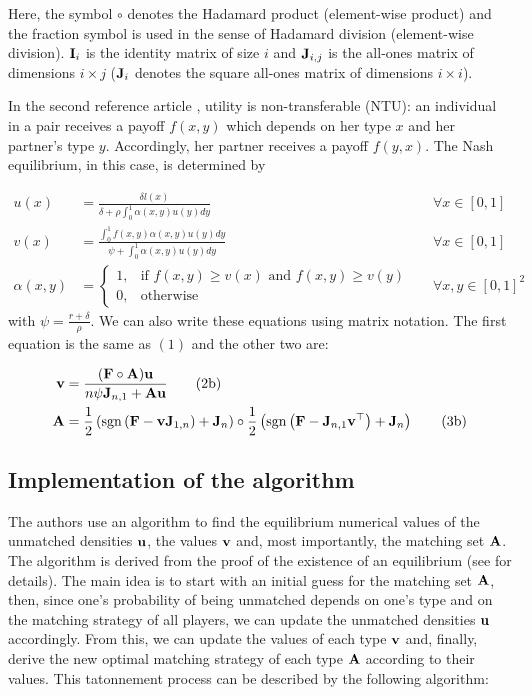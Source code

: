 Here, the symbol $\circ$ denotes the Hadamard product (element-wise product) and the fraction symbol is used in the sense of Hadamard division (element-wise division).
$\boldsymbol{\mathbf{I}}_i$ is the identity matrix of size $i$ and $\boldsymbol{\mathbf{J}}_{i,j}$ is the all-ones matrix of dimensions $i \times j$ ($\boldsymbol{\mathbf{J}}_{i}$ denotes the square all-ones matrix of dimensions $i \times i$).


In the second reference article \citep{smith_marriage_2006}, utility is non-transferable (NTU): an individual in a pair receives a payoff $f(x,y)$ which depends on her type $x$ and her partner's type $y$. Accordingly, her partner receives a payoff $f(y,x)$. The Nash equilibrium, in this case, is determined by

\begin{align*}[left=\empheqlbrace]
	u(x) &= \frac{\delta l(x)}{\delta + \rho \int_{0}^{1} \alpha(x,y) u(y) dy} &&\forall x \in [0,1]\\
	v(x) &= \frac{\int_{0}^{1} f(x,y) \alpha(x,y) u(y) dy}{\psi + \int_{0}^{1} \alpha(x,y) u(y) dy} &&\forall x \in [0,1]\\
	\alpha(x,y) &=
	\begin{cases}
		1, & \text{if } f(x,y) \geq v(x) \text{ and } f(x,y) \geq v(y)\\
		0, & \text{otherwise}
	\end{cases}
	&&\forall x,y \in [0,1]^2 
\end{align*}
with $\psi = \frac{r+\delta}{\rho}$. We can also write these equations using matrix notation. The first equation is the same as $(1)$ and the other two are:

\begin{align}[left=\empheqlbrace]
	\vect{v} &= \frac{(\vect{F} \circ \vect{A})\vect{u}}{n \psi \vect{J}_{n,1} + \vect{A} \vect{u}}
	\tag{2b}\\
	\vect{A} &= \frac{1}{2} \left(\sgn{\left( \vect{F} - \vect{v} \vect{J}_{1,n} \right)} + \vect{J}_n \right) \circ \frac{1}{2} \left(\sgn{\left( \vect{F} - \vect{J}_{n,1} \vect{v}^\top \right)} + \vect{J}_n \right)
	\tag{3b}
\end{align}





\subsection*{Implementation of the algorithm}

The authors use an algorithm to find the equilibrium numerical values of the unmatched densities $\boldsymbol{\mathbf{u}}$, the values $\boldsymbol{\mathbf{v}}$ and, most importantly, the matching set $\boldsymbol{\mathbf{A}}$. The algorithm is derived from the proof of the existence of an equilibrium (see \citep{smith_frictional_2011} for details). The main idea is to start with an initial guess for the matching set $\boldsymbol{\mathbf{A}}$, then, since one's probability of being unmatched depends on one's type and on the matching strategy of all players, we can update the unmatched densities $\boldsymbol{\mathbf{u}}$ accordingly. From this, we can update the values of each type $\boldsymbol{\mathbf{v}}$ and, finally, derive the new optimal matching strategy of each type $\boldsymbol{\mathbf{A}}$ according to their values. This tatonnement process can be described by the following algorithm:

